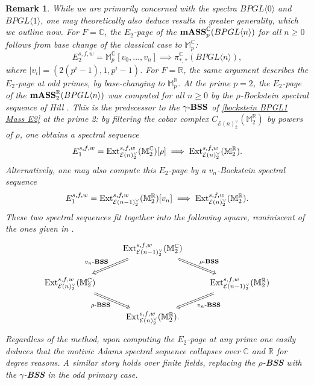 \documentclass{amsart}
\newtheorem{remark}[theorem]{Remark}
\theoremstyle{plain}
\numberwithin{theorem}{section}
\numberwithin{equation}{section}
\numberwithin{figure}{section}
\newcommand{\0}{\langle 0 \rangle }
\begin{document}
\begin{remark}
    \rm While we are primarily concerned with the spectra $BPGL \langle 0 \rangle$ and $BPGL \langle 1 \rangle$, one may theoretically also deduce results in greater generality, which we outline now. For $F=\mathbb{C}$, the $E_2$-page of the $\textup{\textbf{mASS}}_p^{\mathbb{C}}(BPGL \langle n \rangle)$ for all $n \geq 0$ follows from base change of the classical case to $\mathbb{M}_p^\mathbb{C}$:
    \[E^{s,f,w}_2 = \mathbb{M}_p^\mathbb{C}[v_0, \dots, v_n] \implies \pi_{*,*}^\mathbb{C}(BPGL\langle n \rangle),\]
    where $|v_i| = (2(p^i-1), 1, p^i-1)$.
    For $F=\mathbb{R}$, the same argument describes the $E_2$-page at odd primes, by base-changing to $\mathbb{M}_p^\mathbb{R}.$ At the prime $p=2$, the $E_2$-page of the $\textup{\textbf{mASS}}_2^{\mathbb{R}}(BPGL\langle n \rangle)$ was computed for all $n \geq 0$ by the $\rho$-Bockstein spectral sequence of Hill \cite[Theorem 3.1]{Hill11}. This is the predecessor to the $\gamma\textup{-\textbf{BSS}}$ of \cref{bockstein BPGL1 Mass E2} at the prime 2: by filtering the cobar complex $C_{\mathcal{E}(n)_2^\vee}(\mathbb{M}_2^\mathbb{R})$ by powers of $\rho$, one obtains a spectral sequence
    \[E^{s,f,w}_1 = \textup{Ext}^{s,f,w}_{\mathcal{E}(n)_2^\vee}(\mathbb{M}_2^\mathbb{C})[\rho] \implies\textup{Ext}^{s,f,w}_{\mathcal{E}(n)_2^\vee}(\mathbb{M}_2^\mathbb{R}).\]
    Alternatively, one may also compute this $E_2$-page by a $v_n$-Bockstein spectral sequence
    \[E^{s,f,w}_1 = \textup{Ext}^{s,f,w}_{\mathcal{E}(n-1)_2^\vee}(\mathbb{M}_2^\mathbb{R})[v_n] \implies\textup{Ext}^{s,f,w}_{\mathcal{E}(n)_2^\vee}(\mathbb{M}_2^\mathbb{R}).\]
    These two spectral sequences fit together into the following square, reminiscent of the ones given in \cite{CulKonQui21}.
    \begin{equation}
    \begin{tikzcd}
    & \textup{Ext}^{s,f,w}_{\mathcal{E}(n-1)_2^\vee}(\mathbb{M}_2^\mathbb{C}) \arrow[dl,Rightarrow,"v_n\text{-}\textup{\textbf{BSS}}"'] \arrow[dr,Rightarrow,"\rho\text{-}\textup{\textbf{BSS}}"] & \\
    \textup{Ext}^{s,f,w}_{\mathcal{E}(n)_2^\vee}(\mathbb{M}_2^\mathbb{C}) \arrow[dr,Rightarrow,"\rho\text{-}\textup{\textbf{BSS}}"'] & & \textup{Ext}^{s,f,w}_{\mathcal{E}(n-1)_2^\vee}(\mathbb{M}_2^\mathbb{R}) \arrow[dl,Rightarrow,"v_n\text{-}\textup{\textbf{BSS}}"] \\
    & \textup{Ext}^{s,f,w}_{\mathcal{E}(n)_2^\vee}(\mathbb{M}_2^\mathbb{R}). 
    \end{tikzcd}
    \label{ss bockstein square C and R}
    \end{equation}
    Regardless of the method, upon computing the $E_2$-page at any prime one easily deduces that the motivic Adams spectral sequence collapses over $\mathbb{C}$ and $\mathbb{R}$ for degree reasons. A similar story holds over finite fields, replacing the $\rho$-\textbf{BSS} with the $\gamma$-\textbf{BSS} in the odd primary case.
    

\end{remark}
\end{document}
